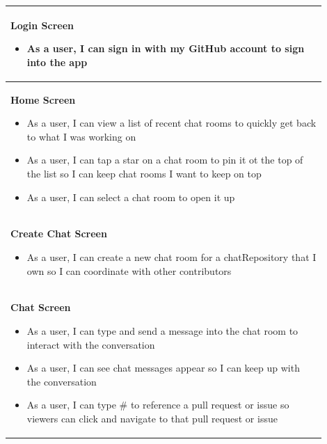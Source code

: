 \documentclass{report}
\begin{document}
\begin{center}
    \begin{tabular}{ | p{0.9\linewidth} |}
        \hline
        \textbf{Login Screen} \begin{itemize}
                                  \item As a user, I can sign in with my GitHub account to sign into the app
                              \end{itemize}                                                        \\
        \hline
        \textbf{Home Screen} \begin{itemize}
                                 \item As a user, I can view a list of recent chat rooms to quickly get back to what I was working on
                                 \item As a user, I can tap a star on a chat room to pin it ot the top of the list so I can keep chat rooms I want to keep on top
                                 \item As a user, I can select a chat room to open it up
                             \end{itemize}   \\
        \hline
        \textbf{Create Chat Screen}\begin{itemize}
                                       \item As a user, I can create a new chat room for a chatRepository that I own so I can coordinate with other contributors
                                   \end{itemize}        \\
        \hline
        \textbf{Chat Screen}\begin{itemize}
                                \item As a user, I can type and send a message into the chat room to interact with the conversation
                                \item As a user, I can see chat messages appear so I can keep up with the conversation
                                \item As a user, I can type \# to reference a pull request or issue so viewers can click and navigate to that pull request or issue


\end{itemize}
\end{tabular}
\end{center}
\end{document}
